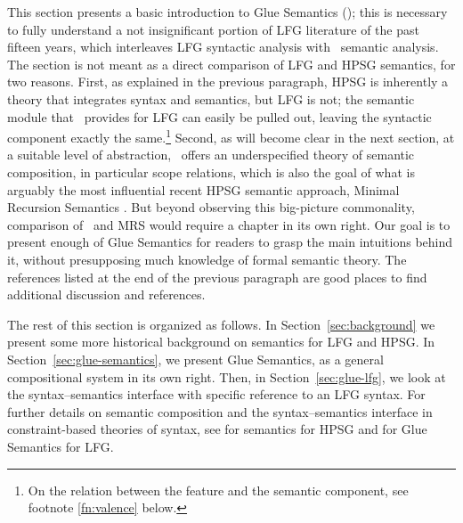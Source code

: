 This section presents a basic introduction to Glue Semantics (\glue); this is necessary to fully understand a not insignificant portion of LFG literature of the past fifteen years, which interleaves LFG syntactic analysis with \glue\ semantic analysis. The section is not meant as a direct comparison of LFG and HPSG semantics, for two reasons. First, as explained in the previous paragraph, HPSG is inherently a theory that integrates syntax and semantics, but LFG is not; the semantic module that \glue\ provides for LFG can easily be pulled out, leaving the syntactic component exactly the same.\footnote{On the relation between the  feature and the semantic component, see footnote \ref{fn:valence} below.} 
Second, as will become clear in the next section, at a suitable level of abstraction, \glue\ offers an underspecified theory of semantic composition, in particular scope relations, which is also the goal of what is arguably the most influential recent HPSG semantic approach, Minimal Recursion Semantics \citep[MRS;][]{copestake;ea05}. But beyond observing this big-picture commonality, comparison of \glue\ and MRS would require a chapter in its own right.
Our goal is to present enough of Glue Semantics for readers to grasp the main intuitions behind it, without presupposing much knowledge of formal semantic theory.  The references listed at the end of the previous paragraph \citep[especially][]{dalrymple;ea19} are good places to find additional discussion and references.

The rest of this section is organized as follows. In Section~\ref{sec:background} we present some more historical background on semantics for LFG and HPSG.  In Section~\ref{sec:glue-semantics}, we present Glue Semantics, as a general compositional system in its own right. Then, in Section~\ref{sec:glue-lfg}, we look at the syntax--semantics interface with specific reference to an LFG syntax. For further details on semantic composition and the syntax--semantics interface in constraint-based theories of syntax, see  for semantics for HPSG and \citet{asudeh-lfg-glue} for Glue Semantics for LFG.

